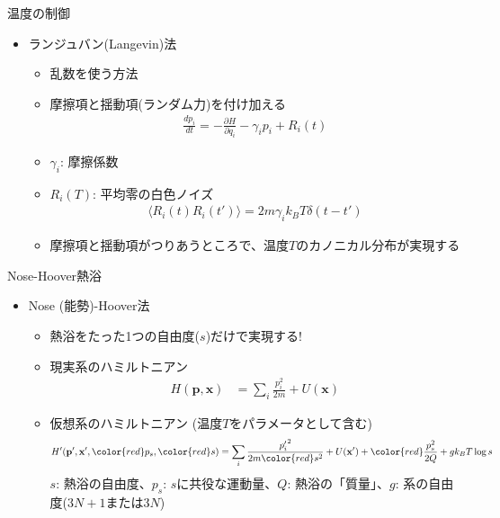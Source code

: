 \begin{frame}[t,fragile]{温度の制御}
  \begin{itemize}
  \item ランジュバン(Langevin)法
    \begin{itemize}
    \item 乱数を使う方法
    \item 摩擦項と揺動項(ランダム力)を付け加える
      \begin{align*}
        \frac{dp_i}{dt} = - \frac{\partial H}{\partial q_i} - \gamma_i p_i + R_i(t)
      \end{align*}
    \item $\gamma_i$: 摩擦係数
    \item $R_i(T)$: 平均零の白色ノイズ
      \begin{align*}
        \langle R_i(t) R_i(t') \rangle = 2 m \gamma_i k_B T \delta(t-t')
      \end{align*}
    \item 摩擦項と揺動項がつりあうところで、温度$T$のカノニカル分布が実現する
    \end{itemize}
  \end{itemize}
\end{frame}

\begin{frame}[t,fragile]{Nose-Hoover熱浴}
  \begin{itemize}
  \item Nose (能勢)-Hoover法
    \begin{itemize}
    \item 熱浴をたった1つの自由度($s$)だけで実現する!
    \item 現実系のハミルトニアン
      \begin{align*}
        H(\mathbf{p},\mathbf{x}) &= \sum_i \frac{p_i^2}{2m} + U(\mathbf{x})
      \end{align*}
    \item 仮想系のハミルトニアン (温度$T$をパラメータとして含む)
      \begin{align*}
        H'(\mathbf{p}',\mathbf{x}',{\color{red}p_s},{\color{red}s}) &= \sum_i \frac{{p'_i}^2}{2m{\color{red}s^2}} + U(\mathbf{x}') + {\color{red}\frac{p_s^2}{2Q} + g k_B T\log s}
      \end{align*}
      $s$: 熱浴の自由度、$p_s$: $s$に共役な運動量、$Q$: 熱浴の「質量」、$g$: 系の自由度($3N+1$または$3N$)
    \end{itemize}
  \end{itemize}
\end{frame}

